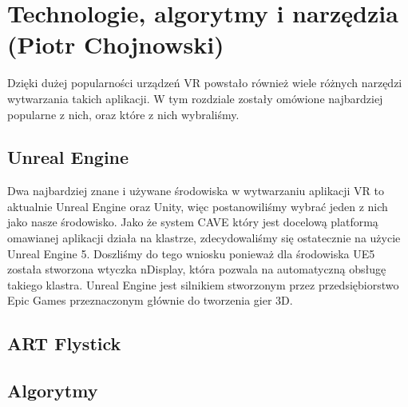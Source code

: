 \chapter{Technologie, algorytmy i narzędzia (Piotr Chojnowski)}
\label{chap:algs}

Dzięki dużej popularności urządzeń VR powstało również wiele różnych narzędzi wytwarzania takich aplikacji. W tym rozdziale zostały omówione najbardziej popularne z nich, oraz które z nich wybraliśmy.

\section{Unreal Engine}
Dwa najbardziej znane i używane środowiska w wytwarzaniu aplikacji VR to aktualnie Unreal Engine oraz Unity, więc postanowiliśmy wybrać jeden z nich jako nasze środowisko. Jako że system CAVE który jest docelową platformą omawianej aplikacji działa na klastrze, zdecydowaliśmy się ostatecznie na użycie Unreal Engine 5. Doszliśmy do tego wniosku ponieważ dla środowiska UE5 została stworzona wtyczka nDisplay, która pozwala na automatyczną obsługę takiego klastra. Unreal Engine jest silnikiem stworzonym przez przedsiębiorstwo Epic Games przeznaczonym głównie do tworzenia gier 3D.

\section{ART Flystick}


\section{Algorytmy}